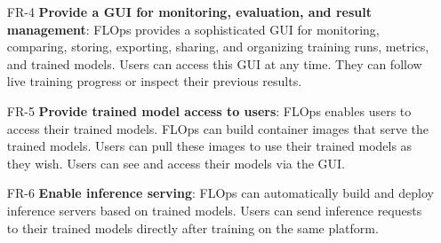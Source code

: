 \begin{itemize}
    \item [FR-4] {\textbf{Provide a GUI for monitoring, evaluation, and result management}}:
        FLOps provides a sophisticated GUI for monitoring, comparing, storing, exporting, sharing, and organizing training runs, metrics, and trained models.
        Users can access this GUI at any time.
        They can follow live training progress or inspect their previous results.
    \item [FR-5] {\textbf{Provide trained model access to users}}:
        FLOps enables users to access their trained models.
        FLOps can build container images that serve the trained models.
        Users can pull these images to use their trained models as they wish.
        Users can see and access their models via the GUI.
    \item [FR-6] {\textbf{Enable inference serving}}:
        FLOps can automatically build and deploy inference servers based on trained models.
        Users can send inference requests to their trained models directly after training on the same platform.
\end{itemize}